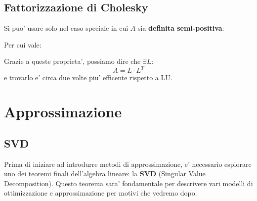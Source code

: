 \subsection{Fattorizzazione di Cholesky}
Si puo' usare solo nel caso speciale in cui $ A $ sia \textbf{definita semi-positiva}:

Per cui vale:

Grazie a queste proprieta', possiamo dire che $ \exists L: $
\[
A = L \cdot L^T
\]
e trovarlo e' circa due volte piu' efficente rispetto a LU.

\section{Approssimazione}
\subsection{SVD}
Prima di iniziare ad introdurre metodi di approssimazione, e' necessario esplorare uno dei teoremi finali dell'algebra lineare: la \textbf{SVD} (Singular Value Decomposition). Questo teorema sara' fondamentale per descrivere vari modelli di ottimizzazione e approssimazione per motivi che vedremo dopo.\\
\\
